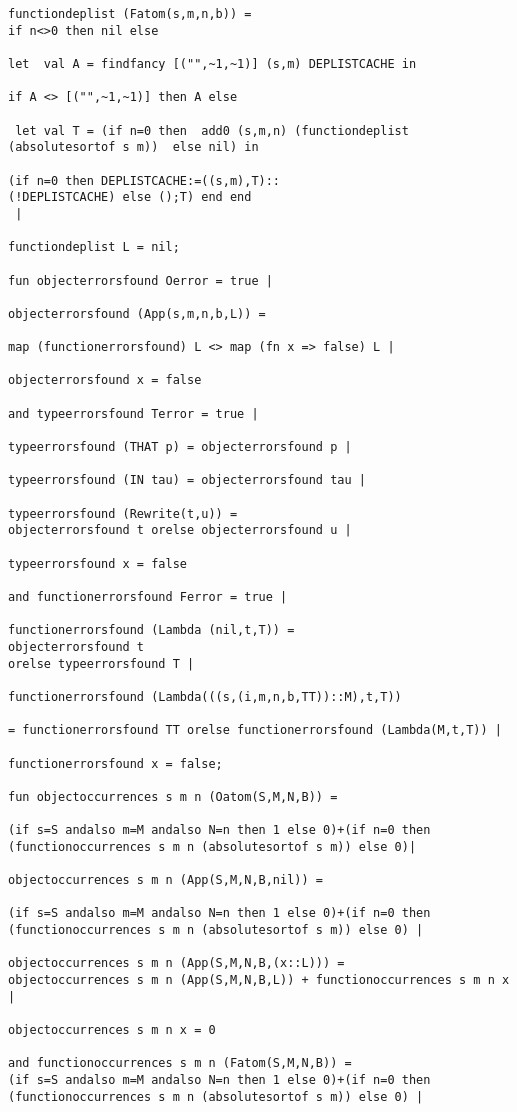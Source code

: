 \documentclass[12pt]{article}
\begin{document}
\begin{verbatim}
functiondeplist (Fatom(s,m,n,b)) = 
if n<>0 then nil else

let  val A = findfancy [("",~1,~1)] (s,m) DEPLISTCACHE in

if A <> [("",~1,~1)] then A else

 let val T = (if n=0 then  add0 (s,m,n) (functiondeplist 
(absolutesortof s m))  else nil) in

(if n=0 then DEPLISTCACHE:=((s,m),T)::
(!DEPLISTCACHE) else ();T) end end
 |

functiondeplist L = nil;

fun objecterrorsfound Oerror = true |

objecterrorsfound (App(s,m,n,b,L)) =

map (functionerrorsfound) L <> map (fn x => false) L |

objecterrorsfound x = false 

and typeerrorsfound Terror = true |

typeerrorsfound (THAT p) = objecterrorsfound p |

typeerrorsfound (IN tau) = objecterrorsfound tau |

typeerrorsfound (Rewrite(t,u)) = 
objecterrorsfound t orelse objecterrorsfound u |

typeerrorsfound x = false 

and functionerrorsfound Ferror = true |

functionerrorsfound (Lambda (nil,t,T)) = 
objecterrorsfound t 
orelse typeerrorsfound T |

functionerrorsfound (Lambda(((s,(i,m,n,b,TT))::M),t,T))

= functionerrorsfound TT orelse functionerrorsfound (Lambda(M,t,T)) |

functionerrorsfound x = false;

fun objectoccurrences s m n (Oatom(S,M,N,B)) =

(if s=S andalso m=M andalso N=n then 1 else 0)+(if n=0 then
(functionoccurrences s m n (absolutesortof s m)) else 0)|

objectoccurrences s m n (App(S,M,N,B,nil)) =

(if s=S andalso m=M andalso N=n then 1 else 0)+(if n=0 then
(functionoccurrences s m n (absolutesortof s m)) else 0) |

objectoccurrences s m n (App(S,M,N,B,(x::L))) =
objectoccurrences s m n (App(S,M,N,B,L)) + functionoccurrences s m n x |

objectoccurrences s m n x = 0

and functionoccurrences s m n (Fatom(S,M,N,B)) =
(if s=S andalso m=M andalso N=n then 1 else 0)+(if n=0 then
(functionoccurrences s m n (absolutesortof s m)) else 0) |


\end{verbatim}
\end{document}
